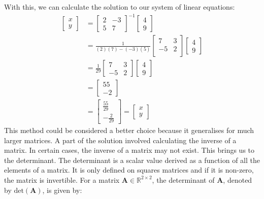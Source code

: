 \documentclass[a4paper,12pt]{book}
\newcommand{\matrx}[1]{\bm{#1}}
\newcommand{\real}{\mathbb{R}}
\newcommand{\dett}[1]{\text{det}(\matrx{#1})}
\begin{document}
	With this, we can calculate the solution to our system of linear equations:
	\begin{align}
		\begin{bmatrix}
			x \\ 
			y
		\end{bmatrix} &= \begin{bmatrix}
			2 & -3 \\
			5 & 7 
		\end{bmatrix}^{-1} \begin{bmatrix}
			4 \\
			9
		\end{bmatrix} \\
		&= \frac{1}{(2)(7)-(-3)(5)} \begin{bmatrix}
			7 & 3 \\
			-5 & 2 \\
		\end{bmatrix} \begin{bmatrix}
			4 \\
			9
		\end{bmatrix} \\
		 &= \frac{1}{29} \begin{bmatrix}
			7 & 3 \\
			-5 & 2
		\end{bmatrix} \begin{bmatrix}
			4 \\
			9
		\end{bmatrix} \\
		&= \begin{bmatrix}
			55 \\
			-2
		\end{bmatrix} \\
		&= \begin{bmatrix}
			\frac{55}{29} \\
			- \frac{2}{29}
		\end{bmatrix} = \begin{bmatrix}
		x \\
		y
	\end{bmatrix}
	\end{align}
	This method could be considered a better choice because it generalises for much larger matrices. A part of the solution involved calculating the inverse of a matrix. In certain cases, the inverse of a matrix may not exist. This brings us to the determinant. The determinant is a scalar value derived as a function of all the elements of a matrix. It is only defined on squares matrices and if it is non-zero, the matrix is invertible. For a matrix $ \matrx{A} \in \real^{2 \times 2} $, the determinant of $ \matrx{A} $, denoted by $ \dett{A} $, is given by:
\end{document}
